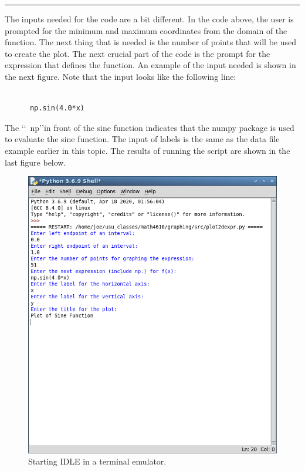 \documentclass[10pt,fleqn]{article}
\begin{document}
\vskip0.1in\hrule\vskip0.1in\noindent
The inputs needed for the code are a bit different. In the code above, the user
is prompted for the minimum and maximum coordinates from the domain of the
function. The next thing that is needed is the number of points that will be
used to create the plot. The next crucial part of the code is the prompt for the
expression that defines the function. An example of the input needed is shown in
the next figure. Note that the input looks like the following line:
\begin{verbatim}

      np.sin(4.0*x)

\end{verbatim}
The \lq\lq\ np\rq\rq in front of the sine function indicates that the numpy
package is used to evaluate the sine function. The input of labels is the same
as the data file example earlier in this topic. The results of running the
script are shown in the last figure below.
\vfill
\begin{figure}[h]
\centering
\includegraphics[width=6.0in]{../images/2ddataplot_04.png}
\vskip0.1in
\caption{Starting IDLE in a terminal emulator.}
\end{figure}
\vfill
\end{document}
